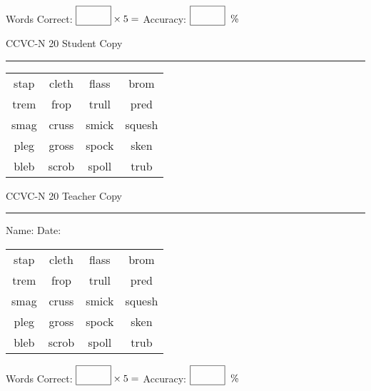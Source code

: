 \documentclass{memoir}
\begin{document}
\small

Words Correct: $\fbox{\phantom{\huge 100}} \times 5 = $ Accuracy: $\fbox{\phantom{\huge 100}}\;\; \%$ 

\vfill

\newpage



\footnotesize \noindent
CCVC-N 20 \hfill Student Copy
\smallskip
\hrule

\Large

\setlength{\tabcolsep}{14pt}
\def\arraystretch{3}

{\selectfont


\begin{vplace}[0.5]
\begin{center}
\begin{tabular}{cccc}
stap & cleth & flass & brom          \\
trem & frop & trull & pred \\
smag & cruss & smick & squesh \\
pleg & gross                    & spock & sken \\
bleb & scrob & spoll & trub \\
\end{tabular}
\end{center}
\end{vplace}

}

\newpage

\footnotesize \noindent
CCVC-N 20 \hfill Teacher Copy
\smallskip
\hrule

\small

\vfill

\noindent
Name: \underline{\hspace{1.75in}} \hfill Date: \underline{\hspace{1in}}

\Large

{\selectfont


\begin{vplace}[0.5]
\begin{center}
\begin{tabular}{cccc}
stap & cleth & flass & brom          \\
trem & frop & trull & pred \\
smag & cruss & smick & squesh \\
pleg & gross                    & spock & sken \\
bleb & scrob & spoll & trub \\
\end{tabular}
\end{center}
\end{vplace}



}

\small

Words Correct: $\fbox{\phantom{\huge 100}} \times 5 = $ Accuracy: $\fbox{\phantom{\huge 100}}\;\; \%$ 

\vfill

\end{document}
